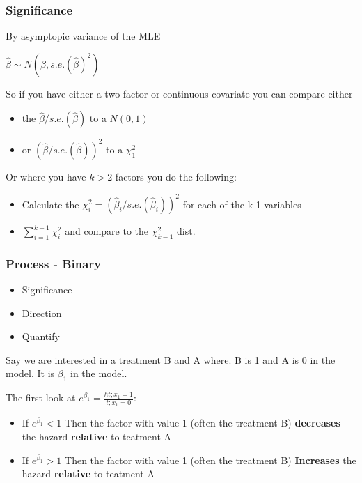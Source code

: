 \documentclass[
  letterpaper,
  DIV=11,
  numbers=noendperiod]{scrreprt}
\providecommand{\tightlist}{%
  \setlength{\itemsep}{0pt}\setlength{\parskip}{0pt}}\usepackage{longtable,booktabs,array}
\begin{document}
\hypertarget{significance}{%
\subsubsection{Significance}\label{significance}}

By asymptopic variance of the MLE

\(\hat{\beta} \sim N(\beta, s.e.(\hat{\beta})^2)\)

So if you have either a two factor or continuous covariate you can
compare either

\begin{itemize}
\tightlist
\item
  the \(\hat{\beta}/s.e.(\hat{\beta})\) to a \(N(0,1)\)
\item
  or \((\hat{\beta}/s.e.(\hat{\beta}))^2\) to a \(\chi_1^2\)
\end{itemize}

Or where you have \(k >2\) factors you do the following:

\begin{itemize}
\tightlist
\item
  Calculate the \(\chi_i^2 = (\hat{\beta}_i/s.e.(\hat{\beta}_i))^2\) for
  each of the k-1 variables
\item
  \(\sum^{k-1}_{i=1}\chi_i^2\) and compare to the \(\chi_{k-1}^2\) dist.
\end{itemize}

\hypertarget{process---binary}{%
\subsubsection{Process - Binary}\label{process---binary}}

\begin{itemize}
\tightlist
\item
  Significance
\item
  Direction
\item
  Quantify
\end{itemize}

Say we are interested in a treatment B and A where. B is 1 and A is 0 in
the model. It is \(\beta_1\) in the model.

The first look at \(e^{\beta_1} = \frac{h{t;x_1=1}}{t;x_1=0}\):

\begin{itemize}
\tightlist
\item
  If \(e^{\beta_1} <1\) Then the factor with value 1 (often the
  treatment B) \textbf{decreases} the hazard \textbf{relative} to
  teatment A
\item
  If \(e^{\beta_1} >1\) Then the factor with value 1 (often the
  treatment B) \textbf{Increases} the hazard \textbf{relative} to
  teatment A
\end{itemize}
\end{document}
